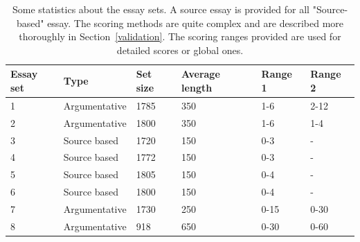 \documentclass[a4paper,12pt,english]{article}
\begin{document}
\begin{table}
	\centering
	\begin{tabular}{llllll}
	\hline
	Essay set & Type & Set size & Average length & Range 1 & Range 2\\
	\hline
	1 & Argumentative & 1785 & 350 & 1-6 & 2-12\\
	2 & Argumentative & 1800 & 350 & 1-6 & 1-4\\
	3 & Source based  & 1720 & 150 & 0-3 & -\\
	4 & Source based  & 1772 & 150 & 0-3 & -\\
	5 & Source based  & 1805 & 150 & 0-4 & -\\
	6 & Source based  & 1800 & 150 & 0-4 & -\\
	7 & Argumentative & 1730 & 250 & 0-15 & 0-30\\
	8 & Argumentative & 918  & 650 & 0-30 & 0-60\\
	\hline
	\end{tabular}
	\caption{Some statistics about the essay sets. A source essay is provided for all "Source-based" essay. The scoring methods are quite complex and are described more thoroughly in Section~\ref{validation}. The scoring ranges provided are used for detailed scores or global ones.}
	\label{setsdescription}
\end{table}
\end{document}
